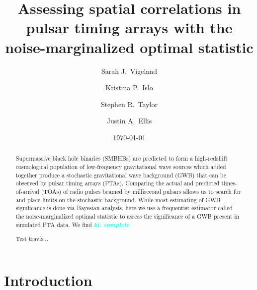 \documentclass[twocolumn,aps,prd,superscriptaddress]{revtex4-1}
\newcommand{\ki}[1]{\textcolor{cyan}{\it{\textbf{ki: #1}}} }
\begin{document}
\title{Assessing spatial correlations in pulsar timing arrays with the noise-marginalized optimal statistic}


\author{Sarah J.\ Vigeland}

\author{Kristina P.\ Islo}

\author{Stephen R.\ Taylor}

\author{Justin A.\ Ellis}

\date{\today}  

\begin{abstract}
Supermassive black hole binaries (SMBHBs) are predicted to form a 
high-redshift cosmological population of low-frequency gravitational wave sources 
which added together produce a stochastic gravitational wave background (GWB) 
that can be observed by pulsar timing arrays (PTAs). 
Comparing the actual and predicted times-of-arrival (TOAs) of radio pulses beamed by 
millisecond pulsars allows us to search for and place limits on the stochastic background. 
While most estimating of GWB significance is done via Bayesian analysis, 
here we use a frequentist estimator called the noise-marginalized optimal statistic 
to assess the significance of a GWB present in simulated PTA data. We find \ki{complete}

Test travis...

\end{abstract}

\maketitle


\section{Introduction}
\end{document}
